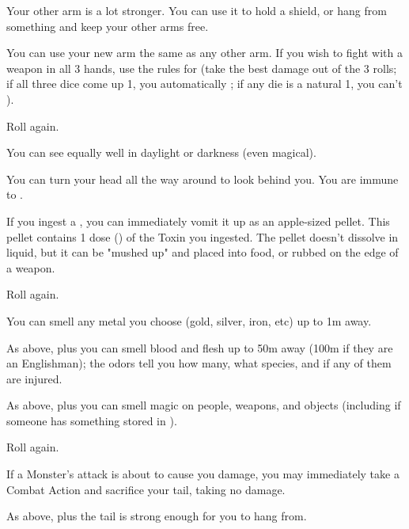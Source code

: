 \begin{multicols*}{2}
  Your other arm is a lot stronger.  You can use it to hold a shield, or hang from something and keep your other arms free.

  You can use your new arm the same as any other arm. If you wish to fight with a weapon in all 3 hands, use the rules for  (take the best damage out of the 3 rolls; if all three dice come up 1, you automatically ; if any die is a natural 1, you can't ).

  Roll again.

\NC[Name=Owl Head]

 You can see equally well in daylight or darkness (even magical). 

 You can turn your head all the way around to look behind you. You are immune to .

 If you ingest a , you can immediately vomit it up as an apple-sized pellet. This pellet contains 1 dose () of the Toxin you ingested. The pellet doesn't dissolve in liquid, but it can be "mushed up" and placed into food, or rubbed on the edge of a weapon.

 Roll again.


\NC[Name=Pig Snout]

 You can smell any metal you choose (gold, silver, iron, etc) up to 1m away.

 As above, plus you can smell blood and flesh up to 50m away (100m if they are an Englishman); the odors tell you how many, what species, and if any of them are injured.

 As above, plus you can smell magic on people, weapons, and objects (including if someone has something stored in ).

 Roll again.

\NC[Name=Rat Tail]

 If a Monster's attack is about to cause you  damage, you may immediately take a Combat Action and sacrifice your tail, taking no damage.

 As above, plus the tail is strong enough for you to hang from.


\end{multicols*}
